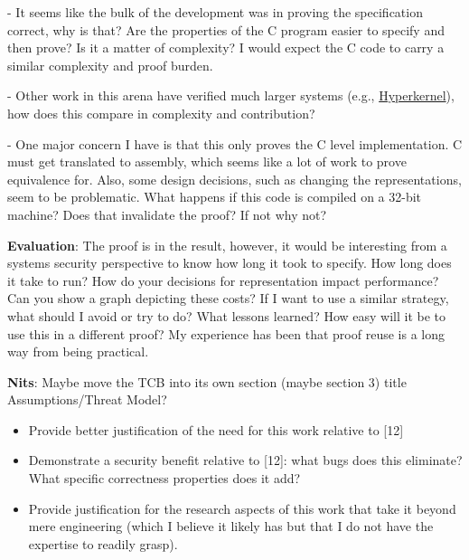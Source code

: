 - It seems like the bulk of the development was in proving the specification correct, why is that? Are the properties of the C program easier to specify and then prove? Is it a matter of complexity? I would expect the C code to carry a similar complexity and proof burden.

- Other work in this arena have verified much larger systems (e.g., \href{https://unsat.cs.washington.edu/papers/nelson-hyperkernel.pdf}{Hyperkernel}), how does this compare in complexity and contribution?

- One major concern I have is that this only proves the C level implementation. C must get translated to assembly, which seems like a lot of work to prove equivalence for. Also, some design decisions, such as changing the representations, seem to be problematic. What happens if this code is compiled on a 32-bit machine? Does that invalidate the proof? If not why not?

\textbf{Evaluation}: The proof is in the result, however, it would be interesting from a systems security perspective to know how long it took to specify. How long does it take to run? How do your decisions for representation impact performance? Can you show a graph depicting these costs? If I want to use a similar strategy, what should I avoid or try to do? What lessons learned? How easy will it be to use this in a different proof? My experience has been that proof reuse is a long way from being practical.

\textbf{Nits}: Maybe move the TCB into its own section (maybe section 3) title Assumptions/Threat Model?

\begin{center}
\end{center}

\begin{itemize}
    \item Provide better justification of the need for this work relative to [12]
    \item Demonstrate a security benefit relative to [12]: what bugs does this eliminate? What specific correctness properties does it add?
    \item Provide justification for the research aspects of this work that take it beyond mere engineering (which I believe it likely has but that I do not have the expertise to readily grasp).
\end{itemize}

